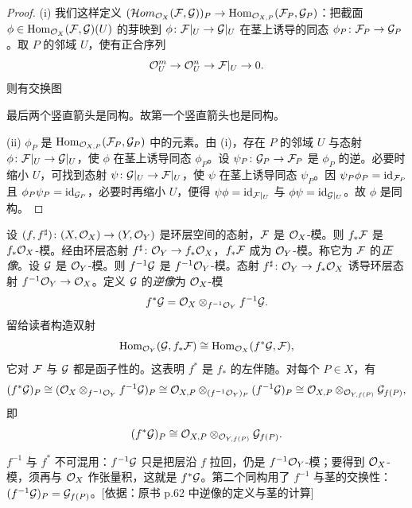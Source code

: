 \begin{proof}
(i) 我们这样定义 $(\mathcal{H}om_{\mathcal{O}_X}(\mathcal{F},\mathcal{G}))_P\to\operatorname{Hom}_{\mathcal{O}_{X,P}}(\mathcal{F}_P,\mathcal{G}_P)$：把截面 $\phi\in\operatorname{Hom}_{\mathcal{O}_X}(\mathcal{F},\mathcal{G})(U)$ 的芽映到 $\phi\colon\mathcal{F}|_U\to\mathcal{G}|_U$ 在茎上诱导的同态 $\phi_P\colon\mathcal{F}_P\to\mathcal{G}_P$。取 $P$ 的邻域 $U$，使有正合序列
\[
\mathcal{O}_U^{m}\to\mathcal{O}_U^{n}\to\mathcal{F}|_U\to0.
\]
则有交换图
\begin{center}
\end{center}
最后两个竖直箭头是同构。故第一个竖直箭头也是同构。

(ii) $\phi_P$ 是 $\operatorname{Hom}_{\mathcal{O}_{X,P}}(\mathcal{F}_P,\mathcal{G}_P)$ 中的元素。由 (i)，存在 $P$ 的邻域 $U$ 与态射 $\phi\colon\mathcal{F}|_U\to\mathcal{G}|_U$，使 $\phi$ 在茎上诱导同态 $\phi_P$。设 $\psi_P\colon\mathcal{G}_P\to\mathcal{F}_P$ 是 $\phi_P$ 的逆。必要时缩小 $U$，可找到态射 $\psi\colon\mathcal{G}|_U\to\mathcal{F}|_U$，使 $\psi$ 在茎上诱导同态 $\psi_P$。因 $\psi_P\phi_P=\operatorname{id}_{\mathcal{F}_P}$ 且 $\phi_P\psi_P=\operatorname{id}_{\mathcal{G}_P}$，必要时再缩小 $U$，便得 $\psi\phi=\operatorname{id}_{\mathcal{F}|_U}$ 与 $\phi\psi=\operatorname{id}_{\mathcal{G}|_U}$。故 $\phi$ 是同构。
\end{proof}

设 $(f,f^\sharp)\colon(X,\mathcal{O}_X)\to(Y,\mathcal{O}_Y)$ 是环层空间的态射，$\mathcal{F}$ 是 $\mathcal{O}_X$-模。则 $f_*\mathcal{F}$ 是 $f_*\mathcal{O}_X$-模。经由环层态射 $f^\sharp\colon\mathcal{O}_Y\to f_*\mathcal{O}_X$，$f_*\mathcal{F}$ 成为 $\mathcal{O}_Y$-模。称它为 $\mathcal{F}$ 的\emph{正像}。设 $\mathcal{G}$ 是 $\mathcal{O}_Y$-模。则 $f^{-1}\mathcal{G}$ 是 $f^{-1}\mathcal{O}_Y$-模。态射 $f^\sharp\colon\mathcal{O}_Y\to f_*\mathcal{O}_X$ 诱导环层态射 $f^{-1}\mathcal{O}_Y\to\mathcal{O}_X$。定义 $\mathcal{G}$ 的\emph{逆像}为 $\mathcal{O}_X$-模
\[
f^*\mathcal{G}=\mathcal{O}_X\otimes_{f^{-1}\mathcal{O}_Y}f^{-1}\mathcal{G}.
\]
留给读者构造双射
\[
\operatorname{Hom}_{\mathcal{O}_Y}(\mathcal{G},f_*\mathcal{F})\cong\operatorname{Hom}_{\mathcal{O}_X}(f^*\mathcal{G},\mathcal{F}),
\]
它对 $\mathcal{F}$ 与 $\mathcal{G}$ 都是函子性的。这表明 $f^*$ 是 $f_*$ 的左伴随。对每个 $P\in X$，有
\[
(f^*\mathcal{G})_P\cong(\mathcal{O}_X\otimes_{f^{-1}\mathcal{O}_Y}f^{-1}\mathcal{G})_P
\cong\mathcal{O}_{X,P}\otimes_{(f^{-1}\mathcal{O}_Y)_P}(f^{-1}\mathcal{G})_P
\cong\mathcal{O}_{X,P}\otimes_{\mathcal{O}_{Y,f(P)}}\mathcal{G}_{f(P)},
\]
即
\[
(f^*\mathcal{G})_P\cong\mathcal{O}_{X,P}\otimes_{\mathcal{O}_{Y,f(P)}}\mathcal{G}_{f(P)}.
\]
\begin{tnote}
$f^{-1}$ 与 $f^*$ 不可混用：$f^{-1}\mathcal{G}$ 只是把层沿 $f$ 拉回，仍是 $f^{-1}\mathcal{O}_Y$-模；要得到 $\mathcal{O}_X$-模，须再与 $\mathcal{O}_X$ 作张量积，这就是 $f^*\mathcal{G}$。第二个同构用了 $f^{-1}$ 与茎的交换性：$(f^{-1}\mathcal{G})_P=\mathcal{G}_{f(P)}$。[依据：原书 p.62 中逆像的定义与茎的计算]
\end{tnote}

